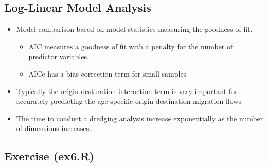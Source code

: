 \documentclass[
]{book}
\providecommand{\tightlist}{%
  \setlength{\itemsep}{0pt}\setlength{\parskip}{0pt}}
\begin{document}
\hypertarget{log-linear-model-analysis-6}{%
\subsection{Log-Linear Model Analysis}\label{log-linear-model-analysis-6}}

\begin{itemize}
\tightlist
\item
  Model comparison based on model statistics measuring the goodness of fit.

  \begin{itemize}
  \tightlist
  \item
    AIC measures a goodness of fit with a penalty for the number of predictor variables.
  \item
    AICc has a bias correction term for small samples
  \end{itemize}
\item
  Typically the origin-destination interaction term is very important for accurately predicting the age-specific origin-destination migration flows
\item
  The time to conduct a dredging analysis increase exponentially as the number of dimensions increases.
\end{itemize}

\hypertarget{exercise-ex6.r}{%
\subsection{Exercise (ex6.R)}\label{exercise-ex6.r}}
\end{document}

